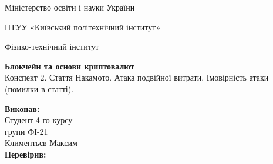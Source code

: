 \documentclass{article}
\begin{document}
    \begin{titlepage}
        \begin{center}

        Міністерство освіти і науки України
        
        НТУУ «Київський політехнічний інститут»
        
        Фізико-технічний інститут
        \vspace{3.3cm}
        
        {\textbf{Блокчейн та основи криптовалют}\\Конспект 2. Стаття Накамото. Атака подвійної витрати. Імовірність атаки (помилки в статті).}

        \vspace{8.5cm}

        \begin{flushright}
            \textbf{Виконав:}\\Студент 4-го курсу\\групи ФІ-21\\Климентьєв Максим\\
            \textbf{Перевірив:}\\\text{\_\_\_\_\_\_\_\_\_\_\_\_\_\_\_\_\_\_}
        \end{flushright}

        \end{center}
    \end{titlepage}
    \newpage

    \tableofcontents
    \cleardoublepage
    \setcounter{page}{3}

    \newpage
\end{document}
